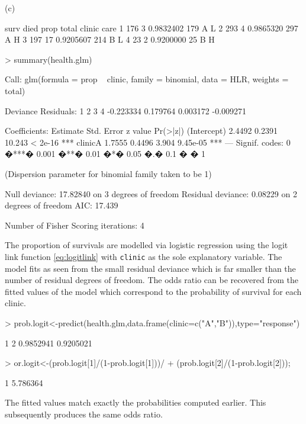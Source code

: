 \documentclass[a4paper,11pt]{article}
\begin{document}
(c)
\begin{small}
\begin{Schunk}
\begin{Soutput}
  surv died      prop total clinic care
1  176    3 0.9832402   179      A    L
2  293    4 0.9865320   297      A    H
3  197   17 0.9205607   214      B    L
4   23    2 0.9200000    25      B    H
\end{Soutput}
\end{Schunk}
\begin{Schunk}
\begin{Sinput}
> summary(health.glm)
\end{Sinput}
\begin{Soutput}
Call:
glm(formula = prop ~ clinic, family = binomial, data = HLR, weights = total)

Deviance Residuals: 
        1          2          3          4  
-0.223334   0.179764   0.003172  -0.009271  

Coefficients:
            Estimate Std. Error z value Pr(>|z|)    
(Intercept)   2.4492     0.2391  10.243  < 2e-16 ***
clinicA       1.7555     0.4496   3.904 9.45e-05 ***
---
Signif. codes:  0 �***� 0.001 �**� 0.01 �*� 0.05 �.� 0.1 � � 1 

(Dispersion parameter for binomial family taken to be 1)

    Null deviance: 17.82840  on 3  degrees of freedom
Residual deviance:  0.08229  on 2  degrees of freedom
AIC: 17.439

Number of Fisher Scoring iterations: 4
\end{Soutput}
\end{Schunk}
\end{small}

The proportion of survivals are modelled via logistic regression using the logit link function \eqref{eq:logitlink} with \texttt{clinic} as the sole explanatory variable. The model fits as seen from the small residual deviance which is far smaller than the number of residual degrees of freedom. The odds ratio can be recovered from the fitted values of the model which correspond to the probability of survival for each clinic.
\begin{Schunk}
\begin{Sinput}
> prob.logit<-predict(health.glm,data.frame(clinic=c("A","B")),type="response")
\end{Sinput}
\begin{Soutput}
        1         2 
0.9852941 0.9205021 
\end{Soutput}
\begin{Sinput}
> or.logit<-(prob.logit[1]/(1-prob.logit[1]))/
+           (prob.logit[2]/(1-prob.logit[2]));
\end{Sinput}
\begin{Soutput}
       1 
5.786364 
\end{Soutput}
\end{Schunk}
The fitted values match exactly the probabilities computed earlier. This subsequently produces the same odds ratio.
\end{document}
